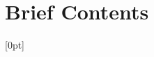 \clearpage
\chapter*{Brief Contents}
\startcontents
\begingroup
\footnotesize
\setcounter{tocdepth}{0}
  [0pt]
  {\vspace{0pt}}
  {\contentslabel{1.5em}}
  {}
  {\contentspage}
\endgroup
\clearpage
\setcounter{tocdepth}{3}
\renewcommand*\contentsname{Table of Contents}
\tableofcontents
\clearpage